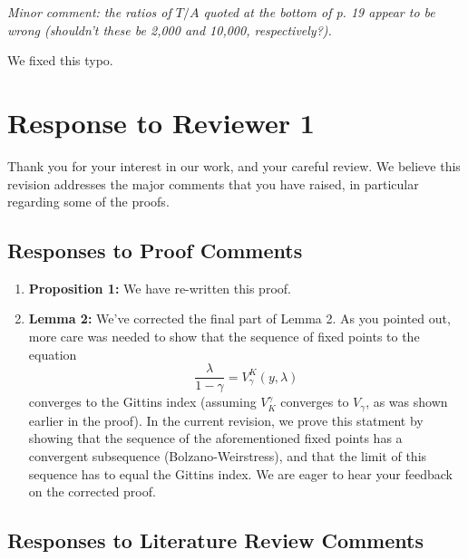 \documentclass[11pt]{article}
\newcommand{\1}{\ensuremath{\mathbf{1}}} %
\theoremstyle{thm-sf}
\begin{document}
	{\it Minor comment: the ratios of $T/A$ quoted at the bottom of p. 19 appear to be wrong (shouldn't these be 2,000 and 10,000, respectively?).}
	
	We fixed this typo.
	
	\newpage
	\section{Response to  Reviewer 1}
	
	Thank you for your interest in our work, and your careful review. We believe this revision addresses the major comments that you have raised, in particular regarding some of the proofs.
	
	\subsection{Responses to Proof Comments}
	
	\begin{enumerate}
		\item \textbf {Proposition 1:} We have re-written this proof.
		\item \textbf {Lemma 2:} We've corrected the final part of Lemma 2. As you pointed out, more care was needed to show that the sequence of fixed points to the equation
		\begin{equation*}
			\frac{\lambda}{1- \gamma} = V^K_\gamma(y, \lambda)
		\end{equation*}
		converges to the Gittins index (assuming $V_K^\gamma$ converges to $V_\gamma$, as was shown earlier in the proof). In the current revision, we prove this statment by showing that the sequence of the aforementioned fixed points has a convergent subsequence (Bolzano-Weirstress), and that the limit of this sequence has to equal the Gittins index. We are eager to hear your feedback on the corrected proof.
	\end{enumerate}
	
	
	\subsection{Responses to Literature Review Comments}
	
\end{document}
